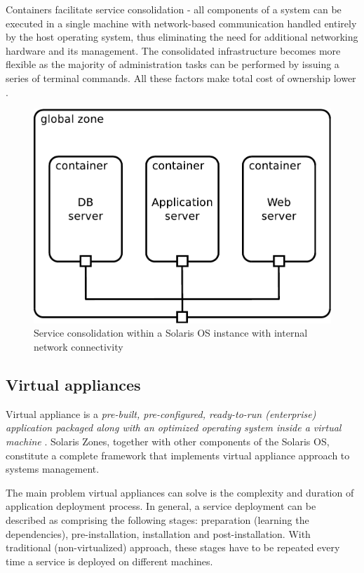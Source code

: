 \documentclass[11pt]{book}
\begin{document}
        Containers facilitate service consolidation - all components of a system can be executed in a single machine
        with network-based communication handled entirely by the host operating system, thus eliminating the need for
        additional networking hardware and its management. The consolidated infrastructure becomes more flexible as the
        majority of administration tasks can be performed by issuing a series of terminal commands. All these factors
        make total cost of ownership lower \cite{price}.

        \begin{figure}[H]
          \begin{center}
            \includegraphics[width=.6\textwidth]{img/solaris/consolidation.pdf}
          \end{center}

          \caption{Service consolidation within a Solaris OS instance with internal network connectivity}
        \end{figure}


      \subsection{Virtual appliances}
      \label{sub:}

        Virtual appliance is a \textit{pre-built, pre-configured, ready-to-run (enterprise) application packaged along
        with an optimized operating system inside a virtual machine} \cite{changhua}. Solaris Zones, together with other
        components of the Solaris OS, constitute a complete framework that implements virtual appliance approach to
        systems management.

        The main problem virtual appliances can solve is the complexity and duration of application deployment process.
        In general, a service deployment can be described as comprising the following stages: preparation (learning the
        dependencies), pre-installation, installation and post-installation. With traditional (non-virtualized)
        approach, these stages have to be repeated every time a service is deployed on different machines.
\end{document}
